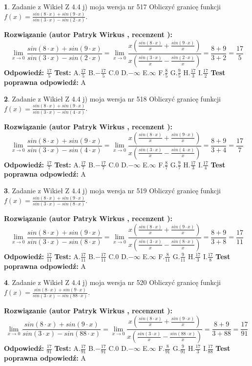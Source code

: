 \documentclass[12pt, a4paper]{article}
\theoremstyle{definition} %
\newtheorem{zad}{}
\newcommand{\zadStart}[1]{\begin{zad}#1\newline}
\newcommand{\zadStop}{\end{zad}}
\newcommand{\rozwStart}[2]{\noindent \textbf{Rozwiązanie (autor #1 , recenzent #2): }\newline}
\newcommand{\rozwStop}{\newline}
\newcommand{\odpStart}{\noindent \textbf{Odpowiedź:}\newline}
\newcommand{\odpStop}{\newline}
\newcommand{\testStart}{\noindent \textbf{Test:}\newline}
\newcommand{\testStop}{\newline}
\newcommand{\kluczStart}{\noindent \textbf{Test poprawna odpowiedź:}\newline}
\newcommand{\kluczStop}{\newline}
\begin{document}
\zadStart{Zadanie z Wikieł Z 4.4 j) moja wersja nr 517}
Obliczyć granicę funkcji $f(x)=\frac{sin(8\cdot x) +sin(9\cdot x)}{sin(3\cdot x) -sin(2\cdot x)}$.
\zadStop
\rozwStart{Patryk Wirkus}{}
$$\lim\limits_{x\to 0}\frac{sin(8\cdot x) +sin(9\cdot x)}{sin(3\cdot x) -sin(2\cdot x)}=\lim\limits_{x\to 0}\frac{x(\frac{sin(8\cdot x)}{x}+\frac{sin(9\cdot x)}{x})}{x(\frac{sin(3\cdot x)}{x}-\frac{sin(2\cdot x)}{x})}=\frac{8+9}{3+2} = \frac{17}{5}$$
\rozwStop
\odpStart
$\frac{17}{5}$
\odpStop
\testStart
A.$\frac{17}{5}$
B.$-\frac{17}{5}$
C.$0$
D.$-\infty$
E.$\infty$
F.$\frac{8}{5}$
G.$\frac{9}{5}$
H.$\frac{17}{3}$
I.$\frac{17}{2}$
\testStop
\kluczStart
A
\kluczStop



\zadStart{Zadanie z Wikieł Z 4.4 j) moja wersja nr 518}
Obliczyć granicę funkcji $f(x)=\frac{sin(8\cdot x) +sin(9\cdot x)}{sin(3\cdot x) -sin(4\cdot x)}$.
\zadStop
\rozwStart{Patryk Wirkus}{}
$$\lim\limits_{x\to 0}\frac{sin(8\cdot x) +sin(9\cdot x)}{sin(3\cdot x) -sin(4\cdot x)}=\lim\limits_{x\to 0}\frac{x(\frac{sin(8\cdot x)}{x}+\frac{sin(9\cdot x)}{x})}{x(\frac{sin(3\cdot x)}{x}-\frac{sin(4\cdot x)}{x})}=\frac{8+9}{3+4} = \frac{17}{7}$$
\rozwStop
\odpStart
$\frac{17}{7}$
\odpStop
\testStart
A.$\frac{17}{7}$
B.$-\frac{17}{7}$
C.$0$
D.$-\infty$
E.$\infty$
F.$\frac{8}{7}$
G.$\frac{9}{7}$
H.$\frac{17}{3}$
I.$\frac{17}{4}$
\testStop
\kluczStart
A
\kluczStop



\zadStart{Zadanie z Wikieł Z 4.4 j) moja wersja nr 519}
Obliczyć granicę funkcji $f(x)=\frac{sin(8\cdot x) +sin(9\cdot x)}{sin(3\cdot x) -sin(8\cdot x)}$.
\zadStop
\rozwStart{Patryk Wirkus}{}
$$\lim\limits_{x\to 0}\frac{sin(8\cdot x) +sin(9\cdot x)}{sin(3\cdot x) -sin(8\cdot x)}=\lim\limits_{x\to 0}\frac{x(\frac{sin(8\cdot x)}{x}+\frac{sin(9\cdot x)}{x})}{x(\frac{sin(3\cdot x)}{x}-\frac{sin(8\cdot x)}{x})}=\frac{8+9}{3+8} = \frac{17}{11}$$
\rozwStop
\odpStart
$\frac{17}{11}$
\odpStop
\testStart
A.$\frac{17}{11}$
B.$-\frac{17}{11}$
C.$0$
D.$-\infty$
E.$\infty$
F.$\frac{8}{11}$
G.$\frac{9}{11}$
H.$\frac{17}{3}$
I.$\frac{17}{8}$
\testStop
\kluczStart
A
\kluczStop



\zadStart{Zadanie z Wikieł Z 4.4 j) moja wersja nr 520}
Obliczyć granicę funkcji $f(x)=\frac{sin(8\cdot x) +sin(9\cdot x)}{sin(3\cdot x) -sin(88\cdot x)}$.
\zadStop
\rozwStart{Patryk Wirkus}{}
$$\lim\limits_{x\to 0}\frac{sin(8\cdot x) +sin(9\cdot x)}{sin(3\cdot x) -sin(88\cdot x)}=\lim\limits_{x\to 0}\frac{x(\frac{sin(8\cdot x)}{x}+\frac{sin(9\cdot x)}{x})}{x(\frac{sin(3\cdot x)}{x}-\frac{sin(88\cdot x)}{x})}=\frac{8+9}{3+88} = \frac{17}{91}$$
\rozwStop
\odpStart
$\frac{17}{91}$
\odpStop
\testStart
A.$\frac{17}{91}$
B.$-\frac{17}{91}$
C.$0$
D.$-\infty$
E.$\infty$
F.$\frac{8}{91}$
G.$\frac{9}{91}$
H.$\frac{17}{3}$
I.$\frac{17}{88}$
\testStop
\kluczStart
A
\kluczStop
\end{document}
